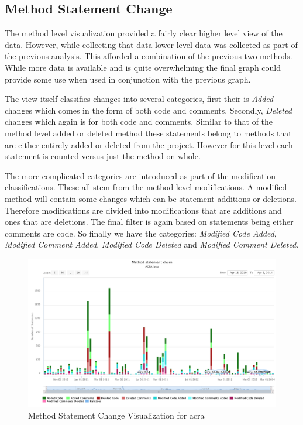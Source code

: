 \subsection{Method Statement Change}

The method level visualization provided a fairly clear higher level view of the data. However, while collecting that data lower level data was collected as part of the previous analysis. This afforded a combination of the previous two methods. While more data is available and is quite overwhelming the final graph could provide some use when used in conjunction with the previous graph.

The view itself classifies changes into several categories, first their is \textit{Added} changes which comes in the form of both code and comments. Secondly, \textit{Deleted} changes which again is for both code and comments. Similar to that of the method level added or deleted method these statements belong to methods that are either entirely added or deleted from the project. However for this level each statement is counted versus just the method on whole.

The more complicated categories are introduced as part of the modification classifications. These all stem from the method level modifications. A modified method will contain some changes which can be statement additions or deletions. Therefore modifications are divided into modifications that are additions and ones that are deletions. The final filter is again based on statements being either comments are code. So finally we have the categories: \textit{Modified Code Added}, \textit{Modified Comment Added}, \textit{Modified Code Deleted} and \textit{Modified Comment Deleted}.

\begin{figure}[!ht]
    \centering
        \includegraphics[width=1.0\textwidth]{images/statement_visual_acra}
    \caption{Method Statement Change Visualization for acra}
    \label{fig:statement_visual_acra}
\end{figure}

